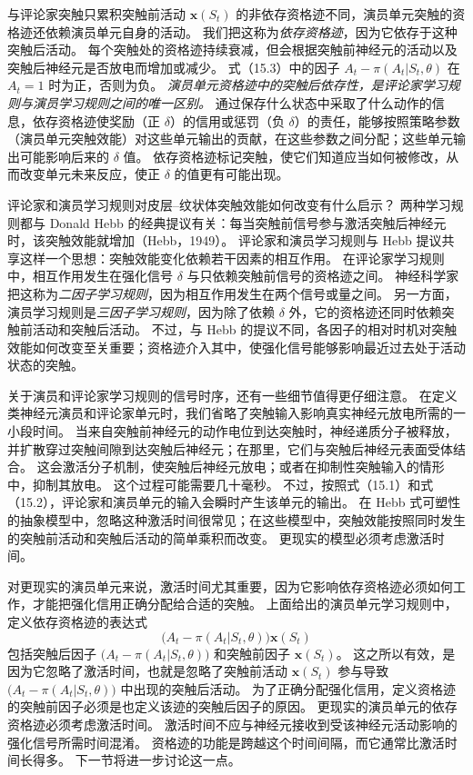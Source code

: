 \documentclass[UTF8,12pt,a4paper,fontset=fandol]{ctexart}
\begin{document}
与评论家突触只累积突触前活动 $\mathbf{x}(S_t)$ 的非依存资格迹不同，演员单元突触的资格迹还依赖演员单元自身的活动。
我们把这称为\textit{依存资格迹}，因为它依存于这种突触后活动。
每个突触处的资格迹持续衰减，但会根据突触前神经元的活动以及突触后神经元是否放电而增加或减少。
式（15.3）中的因子 $A_t-\pi(A_t|S_t,\theta)$ 在 $A_t=1$ 时为正，否则为负。
\textit{演员单元资格迹中的突触后依存性，是评论家学习规则与演员学习规则之间的唯一区别。}
通过保存什么状态中采取了什么动作的信息，依存资格迹使奖励（正 $\delta$）的信用或惩罚（负 $\delta$）的责任，能够按照策略参数（演员单元突触效能）对这些单元输出的贡献，在这些参数之间分配；这些单元输出可能影响后来的 $\delta$ 值。
依存资格迹标记突触，使它们知道应当如何被修改，从而改变单元未来反应，使正 $\delta$ 的值更有可能出现。

评论家和演员学习规则对皮层--纹状体突触效能如何改变有什么启示？
两种学习规则都与 Donald Hebb 的经典提议有关：每当突触前信号参与激活突触后神经元时，该突触效能就增加（Hebb，1949）。
评论家和演员学习规则与 Hebb 提议共享这样一个思想：突触效能变化依赖若干因素的相互作用。
在评论家学习规则中，相互作用发生在强化信号 $\delta$ 与只依赖突触前信号的资格迹之间。
神经科学家把这称为\textit{二因子学习规则}，因为相互作用发生在两个信号或量之间。
另一方面，演员学习规则是\textit{三因子学习规则}，因为除了依赖 $\delta$ 外，它的资格迹还同时依赖突触前活动和突触后活动。
不过，与 Hebb 的提议不同，各因子的相对时机对突触效能如何改变至关重要；资格迹介入其中，使强化信号能够影响最近过去处于活动状态的突触。

关于演员和评论家学习规则的信号时序，还有一些细节值得更仔细注意。
在定义类神经元演员和评论家单元时，我们省略了突触输入影响真实神经元放电所需的一小段时间。
当来自突触前神经元的动作电位到达突触时，神经递质分子被释放，并扩散穿过突触间隙到达突触后神经元；在那里，它们与突触后神经元表面受体结合。
这会激活分子机制，使突触后神经元放电；或者在抑制性突触输入的情形中，抑制其放电。
这个过程可能需要几十毫秒。
不过，按照式（15.1）和式（15.2），评论家和演员单元的输入会瞬时产生该单元的输出。
在 Hebb 式可塑性的抽象模型中，忽略这种激活时间很常见；在这些模型中，突触效能按照同时发生的突触前活动和突触后活动的简单乘积而改变。
更现实的模型必须考虑激活时间。

对更现实的演员单元来说，激活时间尤其重要，因为它影响依存资格迹必须如何工作，才能把强化信用正确分配给合适的突触。
上面给出的演员单元学习规则中，定义依存资格迹的表达式
\[
\big(A_t-\pi(A_t|S_t,\theta)\big)\mathbf{x}(S_t)
\]
包括突触后因子 $\big(A_t-\pi(A_t|S_t,\theta)\big)$ 和突触前因子 $\mathbf{x}(S_t)$。
这之所以有效，是因为它忽略了激活时间，也就是忽略了突触前活动 $\mathbf{x}(S_t)$ 参与导致 $\big(A_t-\pi(A_t|S_t,\theta)\big)$ 中出现的突触后活动。
为了正确分配强化信用，定义资格迹的突触前因子必须是也定义该迹的突触后因子的原因。
更现实的演员单元的依存资格迹必须考虑激活时间。
激活时间不应与神经元接收到受该神经元活动影响的强化信号所需时间混淆。
资格迹的功能是跨越这个时间间隔，而它通常比激活时间长得多。
下一节将进一步讨论这一点。
\end{document}
